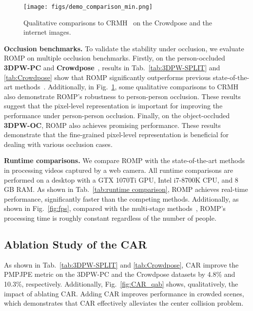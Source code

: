 \documentclass[10pt,twocolumn,letterpaper]{article}
\begin{document}
\begin{figure}[t]
	\centering
	\texttt{[image: figs/demo\_comparison\_min.png]}
	\caption{Qualitative comparisons to CRMH~\cite{jiang2020coherent} on the Crowdpose and the internet images.} 
	\label{fig:demo_comparison}
\end{figure}

\textbf{Occlusion benchmarks.}
To validate the stability under occlusion, we evaluate ROMP on multiple occlusion benchmarks.
Firstly, on the person-occluded \textbf{3DPW-PC} and \textbf{Crowdpose}~\cite{crowdpose}, results in Tab.~\ref{tab:3DPW-SPLIT} and \ref{tab:Crowdpose} show that ROMP significantly outperforms previous state-of-the-art methods~\cite{jiang2020coherent,kocabas2020vibe}.
Additionally, in Fig.~\ref{fig:demo_comparison}, some qualitative comparisons to 
CRMH also demonstrate ROMP's robustness to person-person occlusion.
These results suggest that the pixel-level representation is important for improving the performance under person-person occlusion.
Finally, on the object-occluded \textbf\textbf{3DPW-OC}, ROMP also achieves promising performance.
These results demonstrate that the fine-grained pixel-level representation is beneficial for dealing with various occlusion cases.

\textbf{Runtime comparisons.} 
We compare ROMP with the state-of-the-art methods in processing videos captured by a web camera.
All runtime comparisons are performed on a desktop with a GTX 1070Ti GPU, Intel i7-8700K CPU, and 8 GB RAM.
As shown in Tab.~\ref{tab:runtime comparison}, ROMP achieves real-time performance, significantly faster than the competing methods.
Additionally, as shown in Fig.~\ref{fig:fps}, compared with the multi-stage methods~\cite{jiang2020coherent,kocabas2020vibe}, ROMP's processing time is roughly constant regardless of the number of people. 

\vspace{-1mm}
\subsection{Ablation Study of the CAR}
\vspace{-1mm}
As shown in Tab.~\ref{tab:3DPW-SPLIT} and \ref{tab:Crowdpose}, CAR improve the PMPJPE metric on the 3DPW-PC and the Crowdpose datasets by 4.8\% and 10.3\%, respectively.
Additionally, Fig.~\ref{fig:CAR_qab} shows, qualitatively, the impact of ablating CAR.
Adding CAR improves  performance in  crowded scenes, which demonstrates that CAR effectively alleviates the center collision problem.
\end{document}
